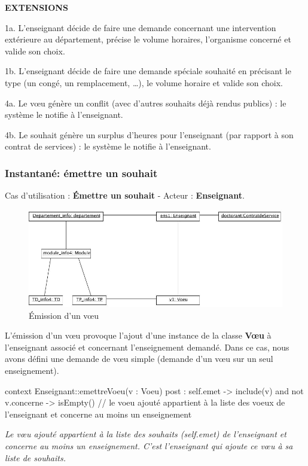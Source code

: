  \noindent\textbf{EXTENSIONS}
 \begin{list}{}{}
 \item 1a. L'enseignant décide de faire une demande concernant une intervention extérieure au département, précise le volume horaires, l'organisme concerné et valide son choix.
 \item 1b. L'enseignant décide de faire une demande spéciale souhaité en précisant le type (un congé, un remplacement, \dots), le volume horaire et valide son choix.
 \item 4a. Le v\oe u génère un conflit (avec d'autres souhaits déjà rendus publics) : le système le notifie à l'enseignant.
 \item 4b. Le souhait génère un surplus d'heures pour l'enseignant (par rapport à son contrat de services) : le système le notifie à l'enseignant.\\
 \end{list}

 \subsubsection{Instantané: émettre un souhait}
 \indent Cas d'utilisation : \textbf{\'Emettre un souhait} - Acteur : \textbf{Enseignant}.

 \begin{figure}[!htbp]
 \begin{center}
 \includegraphics[width=12cm]{fig/2-emissionVoeu.jpg}
 \caption{\'Emission d'un v\oe u}
 \end{center}
 \end{figure}

 \indent L'émission d'un v\oe u provoque l'ajout d'une instance de la classe \textbf{V\oe u} à l'enseignant associé et concernant l'enseignement demandé. Dans ce cas, nous avons défini une demande de v\oe u simple (demande d'un v\oe u sur un seul enseignement).

 \begin{ocl}
 context Enseignant::emettreVoeu(v : Voeu)
 post : self.emet -> include(v)
        and not v.concerne -> isEmpty()
 // le voeu ajouté appartient à la liste des voeux de l'enseignant et concerne au moins un enseignement
 \end{ocl}
 \emph{Le v\oe u ajouté appartient à la liste des souhaits (self.emet) de l'enseignant et concerne au moins un enseignement. C'est l'enseignant qui ajoute ce v\oe u à sa liste de souhaits.}

